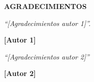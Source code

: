 \newenvironment{acknowledgements}%
    {\thispagestyle{empty}\null\vfill\begin{center}%
    \bfseries AGRADECIMIENTOS\end{center}}%
    {~\vfill}
        \begin{acknowledgements}
   		\textit{``[Agradecimientos autor 1]''.}
   		\begin{flushright}
   			\textbf{[Autor 1]}
   		\end{flushright}
   		\textit{``[Agradecimientos autor 2]''}
   		\begin{flushright}
   			\textbf{[Autor 2]}
   		\end{flushright}
   		
   		
   		
        \end{acknowledgements}